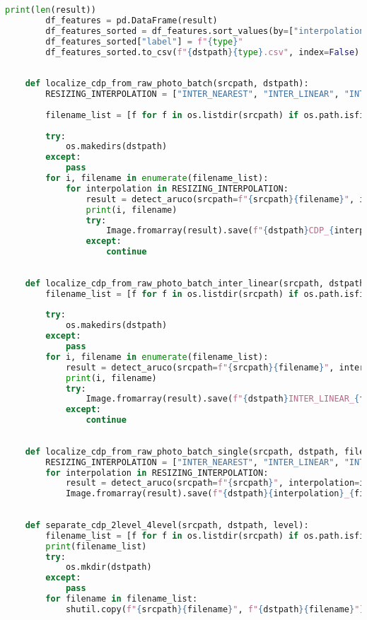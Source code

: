 \begin{lstlisting}[language=Python]
        print(len(result))
        df_features = pd.DataFrame(result)
        df_features_sorted = df_features.sort_values(by=["interpolation", "data"], ascending=[True, True]).reset_index(drop=True)
        df_features_sorted["label"] = f"{type}"
        df_features_sorted.to_csv(f"{dstpath}{type}.csv", index=False)
    
    
    def localize_cdp_from_raw_photo_batch(srcpath, dstpath):
        RESIZING_INTERPOLATION = ["INTER_NEAREST", "INTER_LINEAR", "INTER_AREA", "INTER_CUBIC", "INTER_LANCZOS4"]
    
        filename_list = [f for f in os.listdir(srcpath) if os.path.isfile(srcpath + "/" + f) and srcpath + "/" + f != f"{srcpath}/.DS_Store"]
    
        try:
            os.makedirs(dstpath)
        except:
            pass
        for i, filename in enumerate(filename_list):
            for interpolation in RESIZING_INTERPOLATION:
                result = detect_aruco(srcpath=f"{srcpath}{filename}", interpolation=interpolation, result_type="nparray")
                print(i, filename)
                try:
                    Image.fromarray(result).save(f"{dstpath}CDP_{interpolation}_{filename.split('.')[0]}.png")
                except:
                    continue
    
    
    def localize_cdp_from_raw_photo_batch_inter_linear(srcpath, dstpath):
        filename_list = [f for f in os.listdir(srcpath) if os.path.isfile(srcpath + "/" + f)]
    
        try:
            os.makedirs(dstpath)
        except:
            pass
        for i, filename in enumerate(filename_list):
            result = detect_aruco(srcpath=f"{srcpath}{filename}", interpolation="INTER_LINEAR", result_type="nparray")
            print(i, filename)
            try:
                Image.fromarray(result).save(f"{dstpath}INTER_LINEAR_{filename.split('.')[0]}.png")
            except:
                continue
    
    
    def localize_cdp_from_raw_photo_batch_single(srcpath, dstpath, file_name):
        RESIZING_INTERPOLATION = ["INTER_NEAREST", "INTER_LINEAR", "INTER_AREA", "INTER_CUBIC", "INTER_LANCZOS4"]
        for interpolation in RESIZING_INTERPOLATION:
            result = detect_aruco(srcpath=f"{srcpath}", interpolation=interpolation, result_type="nparray", blur=True, ksize=25)
            Image.fromarray(result).save(f"{dstpath}{interpolation}_{file_name}.png")
    
    
    def separate_cdp_2level_4level(srcpath, dstpath, level):
        filename_list = [f for f in os.listdir(srcpath) if os.path.isfile(srcpath + "/" + f) and srcpath + "/" + f != f"{srcpath}/.DS_Store" if f.split("_")[4] == "{level}LEVEL"]
        print(filename_list)
        try:
            os.mkdir(dstpath)
        except:
            pass
        for filename in filename_list:
            shutil.copy(f"{srcpath}{filename}", f"{dstpath}{filename}")    
\end{lstlisting}
